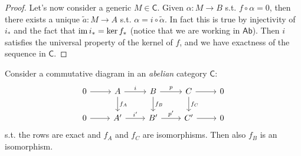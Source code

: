 \documentclass[../Main]{subfiles}
\begin{document}
\begin{proof}
	Let's now consider a generic $M \in \mathsf{C}$.
	Given $\alpha\colon M \to B$ s.t. $f \circ \alpha = 0$, then
	there exists a unique $\tilde{a}\colon M \to A$ s.t. $\alpha = i \circ \tilde{\alpha}$.
	In fact this is true by injectivity of $i_*$ and the fact that
	$\operatorname{im} i_* = \ker f_*$ (notice that we are working in $\mathsf{Ab}$).
	Then $i$ satisfies the universal property of the kernel of $f$, and
	we have exactness of the sequence in $\mathsf{C}$.
\end{proof}

\begin{cor}
	Consider a commutative diagram in an {\em abelian} category $\mathsf{C}$:
	\begin{equation}
	\begin{tikzcd}
		0 \arrow[r, "", rightarrow] &
		A \arrow[r, "i", rightarrow] \arrow[d, "f_A", rightarrow] &
		B \arrow[r, "p", rightarrow] \arrow[d, "f_B", rightarrow] &
		C \arrow[r, "", rightarrow] \arrow[d, "f_C", rightarrow] &
		0 \\
		0 \arrow[r, "", rightarrow] &
		A' \arrow[r, "i'", rightarrow] &
		B' \arrow[r, "p'", rightarrow] &
		C' \arrow[r, "", rightarrow] &
		0
	\end{tikzcd}
	\end{equation} 
	s.t. the rows are exact and $f_A$ and $f_C$ are isomorphisms.
	Then also $f_B$ is an isomorphism.
\end{cor} 
\end{document}
